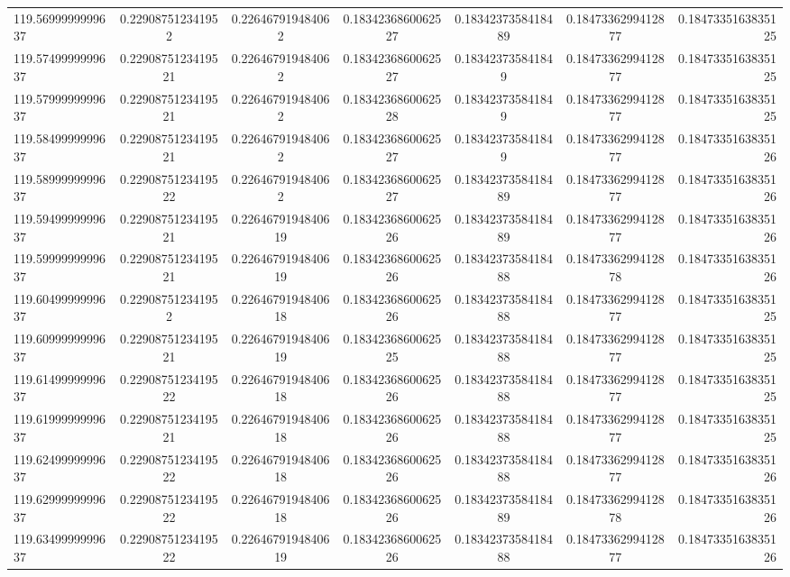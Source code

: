 \begin{tabular}{ l | c | c | c | c | c | r }
119.5699999999637  & 0.229087512341952  & 0.226467919484062  & 0.1834236860062527  & 0.1834237358418489  & 0.1847336299412877  & 0.1847335163835125 \\
119.5749999999637  & 0.2290875123419521  & 0.226467919484062  & 0.1834236860062527  & 0.183423735841849  & 0.1847336299412877  & 0.1847335163835125 \\
119.5799999999637  & 0.2290875123419521  & 0.226467919484062  & 0.1834236860062528  & 0.183423735841849  & 0.1847336299412877  & 0.1847335163835125 \\
119.5849999999637  & 0.2290875123419521  & 0.226467919484062  & 0.1834236860062527  & 0.183423735841849  & 0.1847336299412877  & 0.1847335163835126 \\
119.5899999999637  & 0.2290875123419522  & 0.226467919484062  & 0.1834236860062527  & 0.1834237358418489  & 0.1847336299412877  & 0.1847335163835126 \\
119.5949999999637  & 0.2290875123419521  & 0.2264679194840619  & 0.1834236860062526  & 0.1834237358418489  & 0.1847336299412877  & 0.1847335163835126 \\
119.5999999999637  & 0.2290875123419521  & 0.2264679194840619  & 0.1834236860062526  & 0.1834237358418488  & 0.1847336299412878  & 0.1847335163835126 \\
119.6049999999637  & 0.229087512341952  & 0.2264679194840618  & 0.1834236860062526  & 0.1834237358418488  & 0.1847336299412877  & 0.1847335163835125 \\
119.6099999999637  & 0.2290875123419521  & 0.2264679194840619  & 0.1834236860062525  & 0.1834237358418488  & 0.1847336299412877  & 0.1847335163835125 \\
119.6149999999637  & 0.2290875123419522  & 0.2264679194840618  & 0.1834236860062526  & 0.1834237358418488  & 0.1847336299412877  & 0.1847335163835125 \\
119.6199999999637  & 0.2290875123419521  & 0.2264679194840618  & 0.1834236860062526  & 0.1834237358418488  & 0.1847336299412877  & 0.1847335163835125 \\
119.6249999999637  & 0.2290875123419522  & 0.2264679194840618  & 0.1834236860062526  & 0.1834237358418488  & 0.1847336299412877  & 0.1847335163835126 \\
119.6299999999637  & 0.2290875123419522  & 0.2264679194840618  & 0.1834236860062526  & 0.1834237358418489  & 0.1847336299412878  & 0.1847335163835126 \\
119.6349999999637  & 0.2290875123419522  & 0.2264679194840619  & 0.1834236860062526  & 0.1834237358418488  & 0.1847336299412877  & 0.1847335163835126 \\

\end{tabular}
